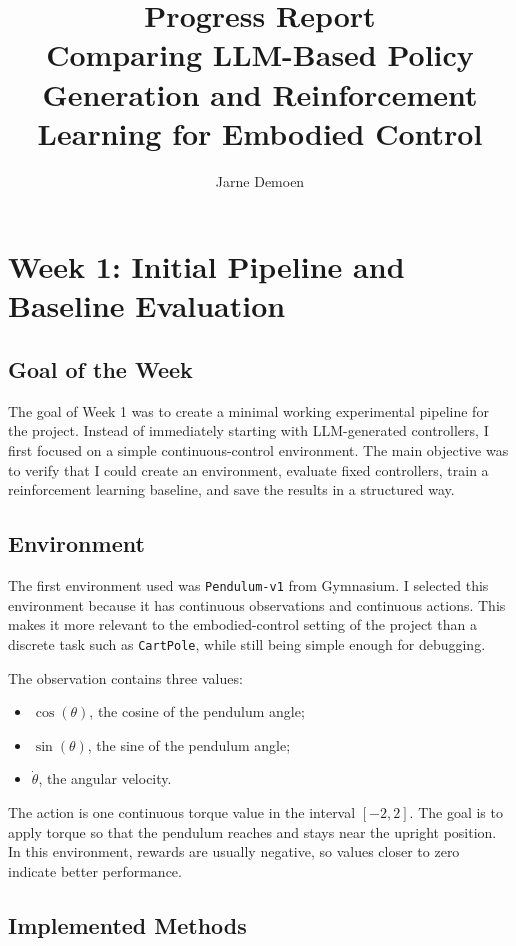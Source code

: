 \documentclass[11pt,a4paper]{article}
\title{\textbf{Progress Report}\\
\vspace{1em}
\large Comparing LLM-Based Policy Generation and Reinforcement Learning for Embodied Control}
\author{Jarne Demoen}
\date{}
\begin{document}
\maketitle

\section{Week 1: Initial Pipeline and Baseline Evaluation}

\subsection{Goal of the Week}

The goal of Week 1 was to create a minimal working experimental pipeline for the project. Instead of immediately starting with LLM-generated controllers, I first focused on a simple continuous-control environment. The main objective was to verify that I could create an environment, evaluate fixed controllers, train a reinforcement learning baseline, and save the results in a structured way.

\subsection{Environment}

The first environment used was \texttt{Pendulum-v1} from Gymnasium. I selected this environment because it has continuous observations and continuous actions. This makes it more relevant to the embodied-control setting of the project than a discrete task such as \texttt{CartPole}, while still being simple enough for debugging.

The observation contains three values:

\begin{itemize}
    \item $\cos(\theta)$, the cosine of the pendulum angle;
    \item $\sin(\theta)$, the sine of the pendulum angle;
    \item $\dot{\theta}$, the angular velocity.
\end{itemize}

The action is one continuous torque value in the interval $[-2,2]$. The goal is to apply torque so that the pendulum reaches and stays near the upright position. In this environment, rewards are usually negative, so values closer to zero indicate better performance.

\subsection{Implemented Methods}
\end{document}

